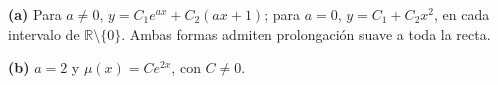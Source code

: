 \noindent\textbf{(a)} Para \(a\ne0\), \(y=C_1e^{ax}+C_2(ax+1)\); para \(a=0\), \(y=C_1+C_2x^2\), en cada intervalo de \(\mathbb R\setminus\{0\}\). Ambas formas admiten prolongación suave a toda la recta.

\noindent\textbf{(b)} \(a=2\) y \(\mu(x)=Ce^{2x}\), con \(C\ne0\).
